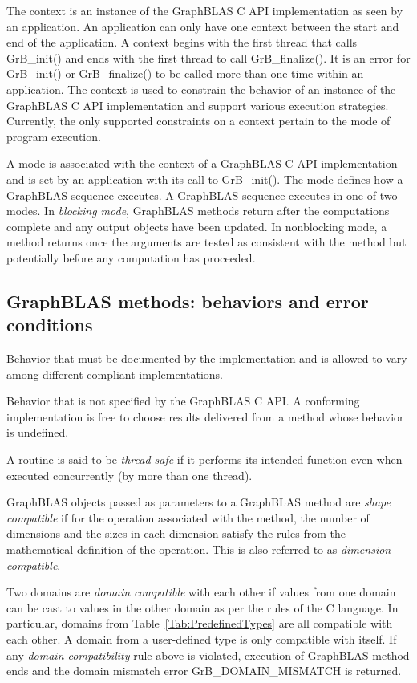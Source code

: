   The context is an instance of the GraphBLAS C API implementation
as seen by an application.  An application can only have one context between the 
start and end of the application.  
A context begins with the first thread that calls {\sf GrB\_init()} and ends with the 
first thread to call {\sf GrB\_finalize()}.  
It is an error for {\sf GrB\_init()} or {\sf GrB\_finalize()} to be called more than one
time within an application.  The context is used to constrain the behavior of an
instance of the GraphBLAS C API implementation and support various execution strategies.
Currently, the only
supported constraints on a context pertain to the mode of program execution.

 A mode is associated with the context of a GraphBLAS C API
implementation and is set by an application with its call to {\sf GrB\_init()}.
The mode defines how a GraphBLAS sequence executes.  A
GraphBLAS sequence executes in one of two modes.  
In \emph{blocking mode}, GraphBLAS methods return after the computations 
complete and any output objects have been updated.  In nonblocking mode, a 
method returns once the arguments are tested as consistent with 
the method but potentially before any computation has proceeded.
\glossEnd

\subsection{GraphBLAS methods: behaviors and error conditions}
\glossBegin
{} Behavior that must be documented
by the implementation and is allowed to vary among different
compliant implementations. 

 Behavior that is not specified by the GraphBLAS C API.
A conforming implementation is free to choose results delivered from a method
whose behavior is undefined. 

 A routine is said to be \emph{thread safe} if it performs its intended 
function even when executed concurrently (by more than one thread).

 GraphBLAS objects passed as parameters to a GraphBLAS method 
are \emph{shape compatible} if for the operation associated with the method, the number of dimensions
and the sizes in each dimension satisfy the rules from the mathematical definition of the operation.  This
is also referred to as \emph{dimension compatible}.

 Two domains are \emph{domain compatible} with 
each other if values from one domain can be cast to values in the other domain 
as per the rules of the C language. In particular, domains from Table~\ref{Tab:PredefinedTypes} 
are all compatible with each other. A domain from a user-defined type is only 
compatible with itself. If any \emph{domain compatibility} rule above is 
violated, execution of GraphBLAS method ends and the domain 
mismatch error {\sf GrB\_DOMAIN\_MISMATCH} is returned.
\glossEnd

